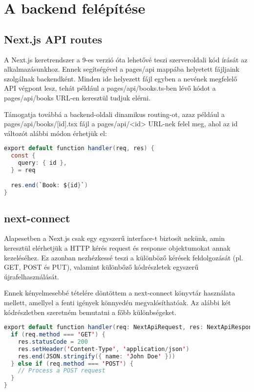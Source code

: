 \section{A backend felépítése}

\subsection{Next.js API routes}

A Next.js keretrendszer a 9-es verzió óta lehetővé teszi szerveroldali kód írását az alkalmazásunkhoz.
Ennek segítségével a pages/api mappába helyetett fájljaink szolgálnak backendként. Minden ide helyezett fájl
egyben a nevének megfelelő API végpont lesz, tehát például a pages/api/books.ts-ben lévő kódot a pages/api/books URL-en keresztül tudjuk elérni.

Támogatja továbbá a backend-oldali dinamikus routing-ot, azaz például a pages/api/books/[id].tsx fájl a pages/api/<id> URL-nek felel meg, ahol
az id változót alábbi módon érhetjük el:

\begin{lstlisting}[language=Java, caption=Next.js dinamikus routing]
export default function handler(req, res) {
  const {
    query: { id },
  } = req

  res.end(`Book: ${id}`)
}
\end{lstlisting}

\subsection{next-connect}
Alapesetben a Next.js csak egy egyszerű interface-t biztosít nekünk, amin keresztül elérhetjük a HTTP kérés request és response objektumokat annak kezeléséhez.
Ez azonban nezhézkessé teszi a különböző kérések feldolgozását (pl. GET, POST és PUT), valamint különbőző kódrészletek egyszerű újrafelhasználását.

Ennek kényelmesebbé tételére döntöttem a next-connect könyvtár használata mellett, amellyel a fenti igények könnyedén megvalósíthatóak.
Az alábbi két kódrészletben szeretném bemutatni a főbb különbségeket.

\begin{lstlisting}[language=Java, caption=Default Next.js API routes]
export default function handler(req: NextApiRequest, res: NextApiResponse) {
  if (req.method === 'GET') {
    res.statusCode = 200
    res.setHeader('Content-Type', 'application/json')
    res.end(JSON.stringify({ name: 'John Doe' }))
  } else if (req.method === 'POST') {
    // Process a POST request
  }
}
\end{lstlisting}

